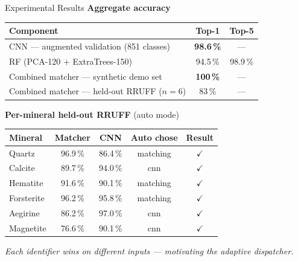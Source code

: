 \documentclass[aspectratio=169,10pt]{beamer}
\begin{document}
\begin{frame}{Experimental Results}
  \textbf{Aggregate accuracy}

  \smallskip
  \footnotesize
  \begin{tabular}{@{}lcc@{}}
    \toprule
    \textbf{Component} & \textbf{Top-1} & \textbf{Top-5}\\
    \midrule
    CNN --- augmented validation (851 classes) & \textbf{98.6\,\%} & ---\\
    RF (PCA-120 $+$ ExtraTrees-150) & 94.5\,\% & 98.9\,\%\\
    Combined matcher --- synthetic demo set & \textbf{100\,\%} & ---\\
    Combined matcher --- held-out RRUFF ($n{=}6$) & 83\,\% & ---\\
    \bottomrule
  \end{tabular}

  \vspace{0.20cm}
  \textbf{Per-mineral held-out RRUFF} (auto mode)

  \smallskip
  \begin{tabular}{@{}lcccc@{}}
    \toprule
    \textbf{Mineral} & \textbf{Matcher} & \textbf{CNN}
      & \textbf{Auto chose} & \textbf{Result}\\
    \midrule
    Quartz     & 96.9\,\% & 86.4\,\% & matching & $\checkmark$\\
    Calcite    & 89.7\,\% & 94.0\,\% & cnn      & $\checkmark$\\
    Hematite   & 91.6\,\% & 90.1\,\% & matching & $\checkmark$\\
    Forsterite & 96.2\,\% & 95.8\,\% & matching & $\checkmark$\\
    Aegirine   & 86.2\,\% & 97.0\,\% & cnn      & $\checkmark$\\
    Magnetite
      & \alert{76.6\,\%} & 90.1\,\% & cnn
      & $\checkmark$\;{\tiny(matcher$\to$Westerveldite)}\\
    \bottomrule
  \end{tabular}

  \vspace{0.12cm}
  \footnotesize\textit{Each identifier wins on different inputs ---
  motivating the adaptive dispatcher.}
\end{frame}
\end{document}
